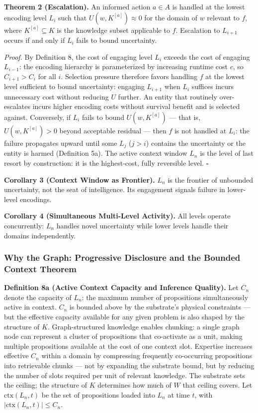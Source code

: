 \documentclass[
]{article}
\begin{document}
\textbf{Theorem 2 (Escalation).} An informed action \(a \in A\) is
handled at the lowest encoding level \(L_i\) such that
\(U(w, K^{[a]}) \approx 0\) for the domain of \(w\) relevant to \(f\),
where \(K^{[a]} \subseteq K\) is the knowledge subset applicable to
\(f\). Escalation to \(L_{i+1}\) occurs if and only if \(L_i\) fails to
bound uncertainty.

\emph{Proof.} By Definition 8, the cost of engaging level \(L_i\)
exceeds the cost of engaging \(L_{i-1}\): the encoding hierarchy is
parameterized by increasing runtime cost \(c\), so \(C_{i+1} > C_i\) for
all \(i\). Selection pressure therefore favors handling \(f\) at the
lowest level sufficient to bound uncertainty: engaging \(L_{i+1}\) when
\(L_i\) suffices incurs unnecessary cost without reducing \(U\) further.
An entity that routinely over-escalates incurs higher encoding costs
without survival benefit and is selected against. Conversely, if \(L_i\)
fails to bound \(U(w, K^{[a]})\) --- that is, \(U(w, K^{[a]}) > 0\)
beyond acceptable residual --- then \(f\) is not handled at \(L_i\): the
failure propagates upward until some \(L_j\) (\(j > i\)) contains the
uncertainty or the entity is harmed (Definition 5a). The active context
window \(L_n\) is the level of last resort by construction: it is the
highest-cost, fully reversible level. \(\square\)

\textbf{Corollary 3 (Context Window as Frontier).} \(L_n\) is the
frontier of unbounded uncertainty, not the seat of intelligence. Its
engagement signals failure in lower-level encodings.

\textbf{Corollary 4 (Simultaneous Multi-Level Activity).} All levels
operate concurrently: \(L_n\) handles novel uncertainty while lower
levels handle their domains independently.

\subsubsection{Why the Graph: Progressive Disclosure and the Bounded
Context
Theorem}\label{why-the-graph-progressive-disclosure-and-the-bounded-context-theorem}

\textbf{Definition 8a (Active Context Capacity and Inference Quality).}
Let \(C_n\) denote the capacity of \(L_n\): the maximum number of
propositions simultaneously active in context. \(C_n\) is bounded above
by the substrate's physical constraints --- but the effective capacity
available for any given problem is also shaped by the structure of
\(K\). Graph-structured knowledge enables chunking: a single graph node
can represent a cluster of propositions that co-activate as a unit,
making multiple propositions available at the cost of one context slot.
Expertise increases effective \(C_n\) within a domain by compressing
frequently co-occurring propositions into retrievable chunks --- not by
expanding the substrate bound, but by reducing the number of slots
required per unit of relevant knowledge. The substrate sets the ceiling;
the structure of \(K\) determines how much of \(W\) that ceiling covers.
Let \(\text{ctx}(L_n, t)\) be the set of propositions loaded into
\(L_n\) at time \(t\), with \(|\text{ctx}(L_n, t)| \leq C_n\).
\end{document}

